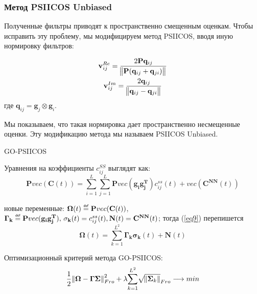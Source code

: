 \documentclass[12pt]{beamer}
\renewcommand{\vec}[1]{\mathbf{#1}}
\newcommand\defeq{\mathrel{\overset{\makebox[0pt]{\mbox{\normalfont\tiny\sffamily def}}}{=}}}
\newcommand{\matr}[1]{\mathbf{#1}}
\begin{document}
\begin{frame}[t]
    \frametitle{Метод PSIICOS Unbiased}
    Полученные фильтры приводят к пространственно смещенным оценкам.
    Чтобы исправить эту проблему, мы модифицируем метод PSIICOS, вводя иную
    нормировку фильтров:
    
\begin{gather*}
    \vec{v}_{ij}^{Re} = \frac{2\matr{P}\vec{q}_{ij}}{\norm{\matr{P}(\vec{q}_{ij} + \vec{q}_{ji})}}\\
    \vec{v}_{ij}^{Im} = \frac{2\vec{q}_{ij}}{\norm{\vec{q}_{ij} - \vec{q}_{ji}}}
\end{gather*}
    где $\vec{q}_{ij} = \mathbf{g}_j\otimes \mathbf{g}_i$.

    Мы показываем, что такая нормировка дает пространственно несмещенные оценки.
    Эту модификацию метода мы называем PSIICOS Unbiased.
\end{frame}

\begin{frame}{GO-PSIICOS}
    \begin{block}{\tiny Уравнения на коэффициенты $c_{ij}^{SS}$ выглядят как:}
  \begin{equation}
      \scriptstyle
      \mathbf{P}vec(\mathbf{C}(t)) = {\sum\limits_{i=1}^{L}\sum\limits_{j=1}^{L}}\mathbf{P}vec(\mathbf{g_{i}g_{j}^T}){c_{ij}^{ss}(t)} + vec(\mathbf{C^{NN}}(t))
      \label{eq9}
  \end{equation}
 \end{block}
 \begin{block}{ новые переменные:}
     \tiny
     $\mathbf{\Omega}(t) \defeq \mathbf{P}vec(\mathbf{C}(t))$,
     $\mathbf{\Gamma_{k}} \defeq \mathbf{P}vec(\mathbf{g_{i}g_{j}^T}),\, \mathbf{\sigma_{k}}(t) = c_{ij}^{ss}(t), \mathbf{N}(t) = \mathbf{C^{NN}}(t)$; тогда (\ref{eq9}) перепишется
  \begin{equation}
   \label{eq10}
   \mathbf{\Omega}(t) = {\sum\limits_{k=1}^{L^{2}}}\mathbf{\Gamma_{k}\sigma_{k}}(t) + \mathbf{N}(t)
  \end{equation}
 \end{block}

 \begin{block}{\tiny Оптимизационный критерий метода GO-PSIICOS:}
     \tiny
   \begin{equation}
    \frac{1}{2}\norm{\mathbf{\Omega} - \mathbf{\Gamma \Sigma}}_{Fro}^{2} +\lambda{\sum\limits_{k=1}^{L^2}}\sqrt{\norm{\mathbf{\Sigma}_{k}}}_{Fro} \longrightarrow min
   \end{equation}
 \end{block}
\end{frame}
\end{document}
